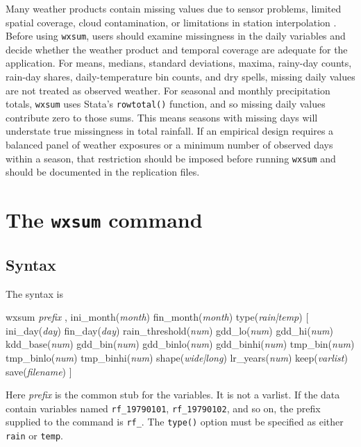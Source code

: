 Many weather products contain missing values due to sensor problems, limited spatial coverage, cloud contamination, or limitations in station interpolation \citep{Dinku2020}. Before using \texttt{wxsum}, users should examine missingness in the daily variables and decide whether the weather product and temporal coverage are adequate for the application. For means, medians, standard deviations, maxima, rainy-day counts, rain-day shares, daily-temperature bin counts, and dry spells, missing daily values are not treated as observed weather. For seasonal and monthly precipitation totals, \texttt{wxsum} uses Stata's \texttt{rowtotal()} function, and so missing daily values contribute zero to those sums. This means seasons with missing days will understate true missingness in total rainfall. If an empirical design requires a balanced panel of weather exposures or a minimum number of observed days within a season, that restriction should be imposed before running \texttt{wxsum} and should be documented in the replication files.

\section{The \texttt{wxsum} command}

\subsection{Syntax}

The syntax is

\begin{stsyntax}
	wxsum {\it prefix\/} , ini\_month({\it month\/}) fin\_month({\it month\/})
	type({\it rain|temp\/}) [ ini\_day({\it day\/}) fin\_day({\it day\/})
	rain\_threshold({\it num\/}) gdd\_lo({\it num\/}) gdd\_hi({\it num\/}) 
    kdd\_base({\it num\/}) gdd\_bin({\it num\/}) gdd\_binlo({\it num\/})
    gdd\_binhi({\it num\/}) tmp\_bin({\it num\/}) tmp\_binlo({\it num\/})
    tmp\_binhi({\it num\/}) shape({\it wide|long\/})
    lr\_years({\it num\/}) keep({\it varlist\/}) save({\it filename\/}) ]
\end{stsyntax}

\noindent Here \textit{prefix} is the common stub for the variables. It is not a varlist. If the data contain variables named \texttt{rf\_19790101}, \texttt{rf\_19790102}, and so on, the prefix supplied to the command is \texttt{rf\_}. The \texttt{type()} option must be specified as either \texttt{rain} or \texttt{temp}.

